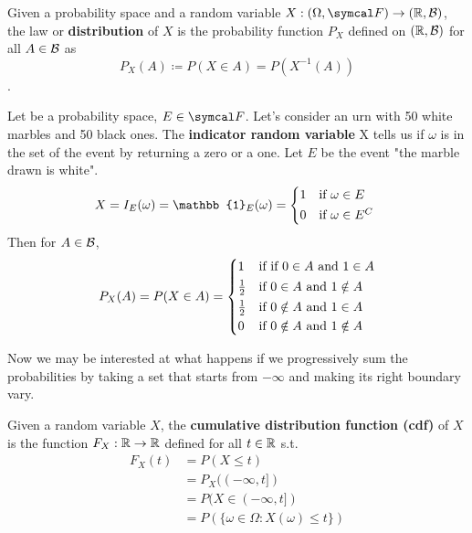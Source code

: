\begin{definition}
    Given a probability space \probspace{} and a random variable $X:\borel\to (\bbR, \calB)$, the law or \textbf{distribution} of $X$ is the probability function $P_X$ defined on $(\mathbb{R}, \mathcal{B})$ for all $A \in \mathcal{B}$ as
    \begin{equation*}
        P_X(A) \coloneq P(X \in A) = P(X^{-1}(A))
    \end{equation*}.
\end{definition}
\begin{example}
    Let \probspace{} be a probability space, $E \in \eff$. Let's consider an urn with 50 white marbles and 50 black ones. The \textbf{indicator random variable} X tells us if $\omega$ is in the set of the event by returning a zero or a one. Let $E$ be the event "the marble drawn is white".
    \begin{equation*}
        X = I_E(\omega)=\mathbb{1}_E(\omega)=\begin{cases*}
            1 & if $\omega \in E$\\
            0 & if $\omega \in E^C$
        \end{cases*}
    \end{equation*}
    Then for $A \in \mathcal{B}$,
    \begin{equation*}
        P_X(A)=P(X \in A) = \begin{cases*}
            1 & if if $0 \in A$ and $1 \in A$\\
            \frac{1}{2} & if $0 \in A$ and $1 \notin A$\\
            \frac{1}{2} & if $0 \notin A$ and $1 \in A$\\
            0 & if $0 \notin A$ and $1 \notin A$
        \end{cases*}
    \end{equation*}
\end{example}
Now we may be interested at what happens if we progressively sum the probabilities by taking a set that starts from $-\infty$ and making its right boundary vary.
\begin{definition}
    Given a random variable $X$, the \textbf{cumulative distribution function (cdf)} of $X$ is the function $F_X:\mathbb{R}\to\mathbb{R}$ defined for all $t \in \mathbb{R}$ s.t.
    \begin{equation*}
        \begin{split}
            F_X(t) & = P(X\le t)\\
            & = P_X((-\infty, t])\\
            & = P(X \in (-\infty, t])\\
            & = P(\{\omega\in\Omega:X(\omega)\le t\})
        \end{split}
    \end{equation*}
\end{definition}
